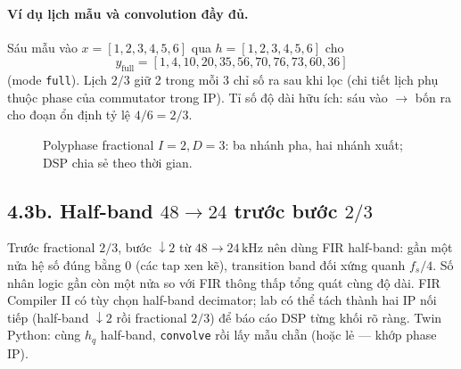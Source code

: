 \paragraph{Ví dụ lịch mẫu và convolution đầy đủ.} Sáu mẫu vào $x=[1,2,3,4,5,6]$ qua $h=[1,2,3,4,5,6]$ cho
\[
y_{\mathrm{full}}=[1,4,10,20,35,56,70,76,73,60,36]
\]
(mode \texttt{full}). Lịch $2/3$ giữ 2 trong mỗi 3 chỉ số ra sau khi lọc (chi tiết lịch phụ thuộc phase của commutator trong IP). Tỉ số độ dài hữu ích: sáu vào $\to$ bốn ra cho đoạn ổn định tỷ lệ $4/6=2/3$.

\begin{figure}[H]
\centering
{}
\caption{Polyphase fractional $I=2,D=3$: ba nhánh pha, hai nhánh xuất; DSP chia sẻ theo thời gian.}
\label{fig:ch04_polyphase}
\end{figure}


\subsection*{4.3b. Half-band $48\to 24$ trước bước $2/3$}

Trước fractional $2/3$, bước $\downarrow 2$ từ $48\to 24\,\text{kHz}$ nên dùng FIR half-band: gần một nửa hệ số đúng bằng 0 (các tap xen kẽ), transition band đối xứng quanh $f_s/4$. Số nhân logic gần còn một nửa so với FIR thông thấp tổng quát cùng độ dài. FIR Compiler II có tùy chọn half-band decimator; lab có thể tách thành hai IP nối tiếp (half-band $\downarrow 2$ rồi fractional $2/3$) để báo cáo DSP từng khối rõ ràng. Twin Python: cùng $h_q$ half-band, \texttt{convolve} rồi lấy mẫu chẵn (hoặc lẻ --- khớp phase IP).

